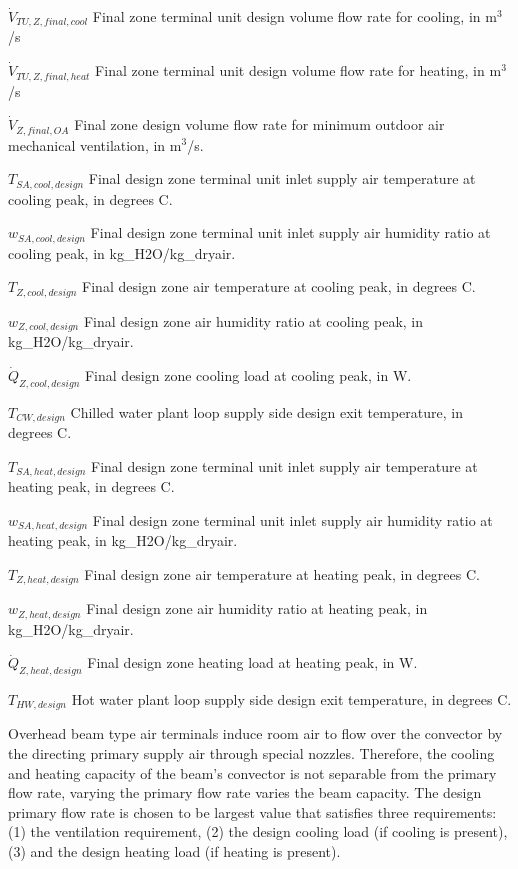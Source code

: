 \({\dot V_{TU,Z,final,cool} }\) Final zone terminal unit design volume flow rate for cooling, in m\(^{3}\)/s

\({\dot V_{TU,Z,final,heat} }\) Final zone terminal unit design volume flow rate for heating, in m\(^{3}\)/s

\({\dot V_{Z,final,OA} }\) Final zone design volume flow rate for minimum outdoor air mechanical ventilation, in m\(^{3}\)/s.

\({T_{SA,cool,design } }\) Final design zone terminal unit inlet supply air temperature at cooling peak, in degrees C.

\({w_{SA,cool,design } }\) Final design zone terminal unit inlet supply air humidity ratio at cooling peak, in kg\_H2O/kg\_dryair.

\({T_{Z,cool,design } }\) Final design zone air temperature at cooling peak, in degrees C.

\({w_{Z,cool,design } }\) Final design zone air humidity ratio at cooling peak, in kg\_H2O/kg\_dryair.

\({\dot Q_{Z,cool,design } }\) Final design zone cooling load at cooling peak, in W.

\({T_{CW,design}}\) Chilled water plant loop supply side design exit temperature, in degrees C.

\({T_{SA,heat,design } }\) Final design zone terminal unit inlet supply air temperature at heating peak, in degrees C.

\({w_{SA,heat,design } }\) Final design zone terminal unit inlet supply air humidity ratio at heating peak, in kg\_H2O/kg\_dryair.

\({T_{Z,heat,design } }\) Final design zone air temperature at heating peak, in degrees C.

\({w_{Z,heat,design } }\) Final design zone air humidity ratio at heating peak, in kg\_H2O/kg\_dryair.

\({\dot Q_{Z,heat,design } }\) Final design zone heating load at heating peak, in W.

\({T_{HW,design}}\) Hot water plant loop supply side design exit temperature, in degrees C.

Overhead beam type air terminals induce room air to flow over the convector by the directing primary supply air through special nozzles. Therefore, the cooling and heating capacity of the beam's convector is not separable from the primary flow rate, varying the primary flow rate varies the beam capacity. The design primary flow rate is chosen to be largest value that satisfies three requirements: (1) the ventilation requirement, (2) the design cooling load (if cooling is present), (3) and the design heating load (if heating is present).

